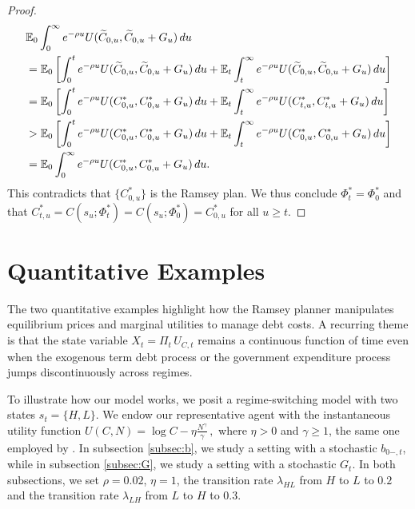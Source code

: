 \documentclass[12pt]{article}
\begin{document}
\begin{proof}
	\begin{align*}
	&  \mathbb{E}_0	\int_0^\infty e^{-\rho u} U(\widetilde{C}_{0,u}, \widetilde{C}_{0,u}+G_u)\, du \notag\\
	&= \mathbb{E}_0 \left[ \int_0^t e^{-\rho u} U(\widetilde{C}_{0,u}, \widetilde{C}_{0,u}+G_u)\, du + \mathbb{E}_t\int_t^\infty e^{-\rho u} U(\widetilde{C}_{0,u}, \widetilde{C}_{0,u}+G_u)\, du \right] \\
	&= \mathbb{E}_0 \left[ \int_0^t e^{-\rho u} U(C_{0,u}^*, C_{0,u}^*+G_u)\, du +  \mathbb{E}_t \int_t^\infty e^{-\rho u} U(C_{t,u}^*, C_{t,u}^*+G_u)\, du \right] \\
	&>  \mathbb{E}_0 \left[ \int_0^t e^{-\rho u} U(C_{0,u}^*, C_{0,u}^*+G_u)\, du + \mathbb{E}_t \int_t^\infty e^{-\rho u} U(C_{0,u}^*, C_{0,u}^*+G_u)\, du \right] \\
	&=  \mathbb{E}_0 \int_0^\infty e^{-\rho u} U(C_{0,u}^*, C_{0,u}^*+G_u)\, du.
	\end{align*}
	This contradicts that $\{C_{0,u}^*\}$ is the Ramsey plan. We thus conclude $\Phi_t^* = \Phi_0^*$ and  that $C_{t,u}^* = C(s_u; \Phi_t^*) = C(s_u; \Phi_0^*) = C_{0,u}^*$ for all $u \ge t$.
	
	
\end{proof}



\section{Quantitative Examples}

The two quantitative examples highlight how the Ramsey planner manipulates equilibrium prices and marginal utilities to manage debt costs. A recurring theme is that the state variable $X_t = \Pi_t\, U_{C,t}$ remains a continuous function of time even when the exogenous term debt process or the government expenditure process jumps discontinuously across regimes.

To illustrate how our model works, we  posit  a regime-switching model with two states $s_t=\{H, L\}$.  We endow our representative agent  with the instantaneous  utility function  %
$U(C, N) = \log C - \eta \frac{N^\gamma}{\gamma}  \, , $ 
where $\eta>0$ and $\gamma\geq 1$, the same  one employed by  \citet*{debortoli2021optimal}.
In subsection \ref{subsec:b},  we study a setting with  a stochastic $b_{0-,t}$, while in subsection \ref{subsec:G}, we study a  setting with a stochastic $G_{t}$. In both subsections,  we set $\rho=0.02$, $\eta=1$, the transition rate $\lambda_{HL}$ from  $H$ to $L$  to $0.2$ and the transition rate $\lambda_{LH}$  from  $L$  to $H$ to $0.3$. 
\end{document}
